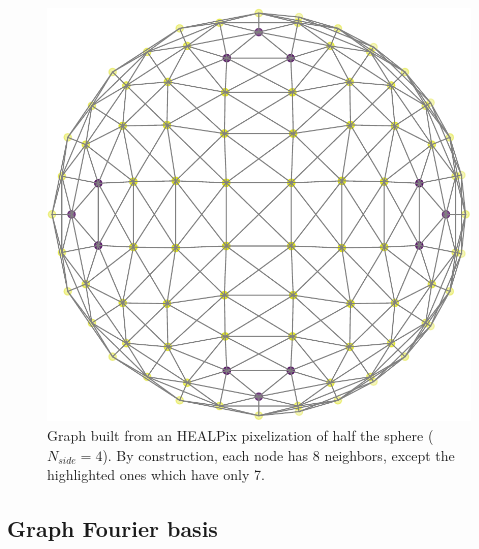 \documentclass[final,twocolumn,3p,times,authoryear]{elsarticle}
\newcommand{\1}{\b{1}}              %
\newcommand{\0}{\b{0}}              %
\begin{document}

\begin{figure}
	\centering
	\includegraphics[width=0.8\linewidth]{half_graph_4}
	\caption[]{Graph built from an HEALPix pixelization of half the sphere ($N_{side} = 4$). By construction, each node has 8 neighbors, except the highlighted ones which have only 7.\footnotemark[6]}
	\label{fig:healpix_graph_4}
\end{figure}

\subsection{Graph Fourier basis}
\end{document}
